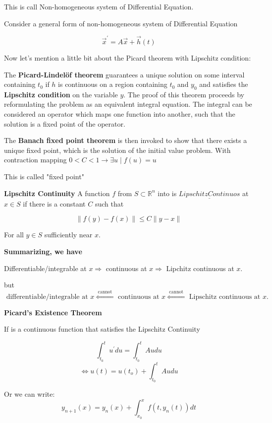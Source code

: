 \documentclass[a4paper]{article}
\begin{document}
This is call Non-homogeneous system of Differential Equation.

Consider a general form of non-homogeneous system of Differential Equation

$$
\vec{x}^{\prime}=A \vec{x}+\vec{h}(t)
$$

Now let's mention a little bit about the Picard theorem with Lipschitz condition:

The \textbf{Picard-Lindelöf theorem} guarantees a unique solution on some interval containing $t_{0}$ if $h$ is continuous on a region containing $t_{0}$ and $y_{0}$ and satisfies the \textbf{Lipschitz condition} on the variable $y$. The proof of this theorem proceeds by reformulating the problem as an equivalent integral equation. The integral can be considered an operator which maps one function into another, such that the solution is a fixed point of the operator.

The \textbf{Banach fixed point theorem} is then invoked to show that there exists a unique fixed point, which is the solution of the initial value problem. With contraction mapping $0<C<1 \rightarrow \exists u \mid f(u)=u$

This is called "fixed point"

{\bf  Lipschitz Continuity}
A function $f$ from $S \subset \mathbb{R}^{n}$ into is $\underline{L i p s c h i t z   C o n t i n u o s}$ at $x \in S$ if there is a constant $C$ such that

$$
\|f(y)-f(x)\| \leq C\|y-x\|
$$

For all $y \in S$ sufficiently near $x$.

\textbf{Summarizing, we have}

Differentiable/integrable at $x \Rightarrow$ continuous at $x \Rightarrow$ Lipchitz continuous at $x$.

but
$$
\text { differentiable/integrable at } x \stackrel{\text { cannot }}{\Leftarrow} \text { continuous at } x \stackrel{\text { cannot }}{\Leftarrow} \text { Lipschitz continuous at } x \text {. }
$$

{\bf  Picard's Existence Theorem}

If is a continuous function that satisfies the Lipschitz Continuity

$$\int_{t_{0}}^{t} u^{\prime} d u=\int_{t_{0}}^{t} A u d u$$
$$\Leftrightarrow u(t)=u\left(t_{o}\right)+\int_{t_{0}}^{t} A u d u$$

Or we can write:
$$y_{n+1}(x)=y_{n}(x)+\int_{x_{0}}^{x} f\left(t, y_{n}(t)\right) d t$$
\end{document}
